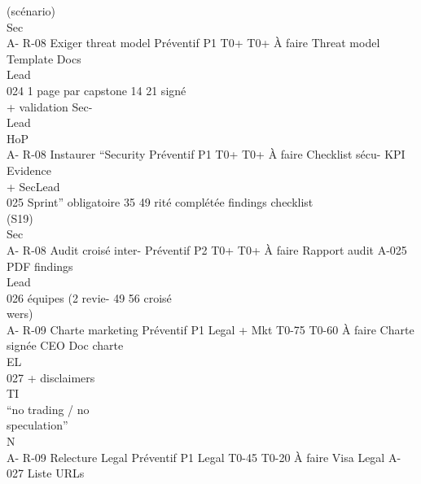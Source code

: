 (scénario)\\
Sec\\
A- R-08     Exiger threat model Préventif P1                T0+ T0+ À faire       Threat model    Template Docs\\
Lead\\
024         1 page par capstone                             14    21              signé\\
+ validation Sec-\\
Lead\\
HoP\\
A- R-08     Instaurer “Security Préventif P1                T0+ T0+ À faire       Checklist sécu- KPI     Evidence\\
+ SecLead\\
025         Sprint” obligatoire                             35    49              rité complétée findings checklist\\
(S19)\\
Sec\\
A- R-08     Audit croisé inter- Préventif P2                T0+ T0+ À faire       Rapport audit A-025        PDF findings\\
Lead\\
026         équipes (2 revie-                               49    56              croisé\\
wers)\\
A- R-09     Charte marketing Préventif P1       Legal + Mkt T0-75 T0-60 À faire   Charte signée   CEO        Doc charte\\
\vspace{0.5em}
\vspace{0.5em}
\vspace{0.5em}
\vspace{0.5em}
EL\\
027         + disclaimers\\
\vspace{0.5em}
\vspace{0.5em}
\vspace{0.5em}
\vspace{0.5em}
TI\\
“no trading / no\\
speculation”\\
\vspace{0.5em}
\vspace{0.5em}
\vspace{0.5em}
\vspace{0.5em}
N\\
A- R-09     Relecture Legal      Préventif P1   Legal       T0-45 T0-20 À faire   Visa Legal      A-027      Liste URLs\\
